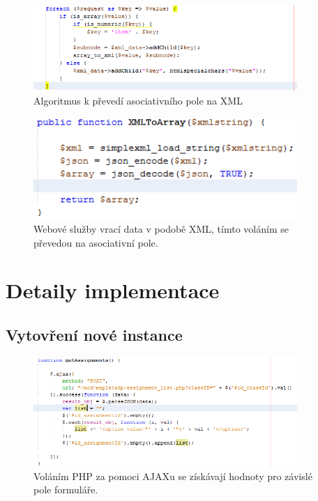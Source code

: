\documentclass[
print,
  11pt,
  table,   
  nolof,    
  nolot,
  oneside,
  final
]{fithesis3}
\begin{document}
		\begin{figure}
		  \begin{center}
		    \includegraphics[width=100mm]{images/prevod_na_xml.png}
		   \end{center}
		  \caption{Algoritmus k převedí asociativního pole na XML}
		  \label{fig:prevodnaxml}
		\end{figure}

		\begin{figure}
		  \begin{center}
		    \includegraphics[width=100mm]{images/xml_na_pole.png}
		   \end{center}
		  \caption{Webové služby vrací data v podobě XML, tímto voláním se převedou na asociativní pole.}
		  \label{fig:prevodnapole}
		\end{figure}

		

	\section{Detaily implementace}
		\subsection{Vytovření nové instance}
		\begin{figure}
		  \begin{center}
		    \includegraphics[width=100mm]{images/ajax-volani.png}
		   \end{center}
		  \caption{Voláním PHP za pomoci AJAXu se získávají hodnoty pro závislé pole formuláře.}
		  \label{fig:volaniajax}
		\end{figure}
\end{document}
